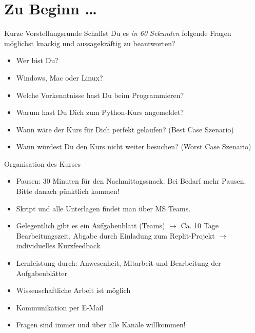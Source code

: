 \section{Zu Beginn \dots}

\begin{frame}
\begin{block}{Kurze Vorstellungsrunde}
	\vspace{2pt}
	Schaffst Du es \emph{in 60 Sekunden} folgende Fragen möglichst knackig und aussagekräftig zu beantworten?
	\begin{itemize}
		\item Wer bist Du? 
		\item Windows, Mac oder Linux?
		\item Welche Vorkenntnisse hast Du beim Programmieren?  
		\item Warum hast Du Dich zum Python-Kurs angemeldet? 
		\item Wann wäre der Kurs für Dich perfekt gelaufen? (Best Case Szenario)
		\item Wann würdest Du den Kurs nicht weiter besuchen? (Worst Case Szenario)
	\end{itemize}
\end{block}
\end{frame}


\begin{frame}
	\begin{block}{Organisation des Kurses}
		\pause 
		\begin{itemize}[<+->]
			\item Pausen: 30 Minuten für den Nachmittagssnack. Bei Bedarf mehr Pausen. Bitte danach pünktlich kommen! 
			\item Skript und alle Unterlagen findet man über MS Teams.
			\item Gelegentlich gibt es ein Aufgabenblatt (Teams) $\rightarrow$ Ca. 10 Tage Bearbeitungszeit, Abgabe durch Einladung zum Replit-Projekt  $\rightarrow$ individuelles Kurzfeedback
			\item Lernleistung durch: Anwesenheit, Mitarbeit und Bearbeitung der Aufgabenblätter 
			\item Wissenschaftliche Arbeit ist möglich
			\item Kommunikation per E-Mail
			\item Fragen sind immer und über alle Kanäle willkommen!
		\end{itemize}
	\end{block}
\end{frame}


